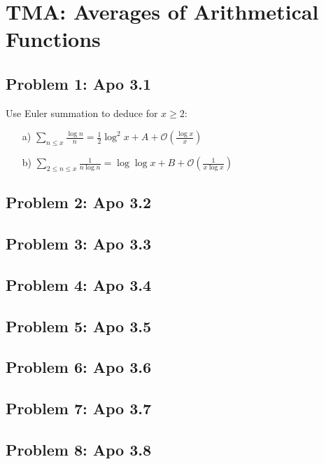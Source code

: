 \section{TMA: Averages of Arithmetical Functions}

\subsection[Problem 1]{Problem 1: Apo 3.1}
Use Euler summation to deduce for $x \geq 2:$
\begin{itemize}
    \item[a)] $\sum_{n \leqslant x} \frac{\log{n}}{n} = \frac{1}{2} \log^2{x} + A + \mathcal{O}(\frac{\log{x}}{x})$
    \item[b)] $\sum_{2 \leqslant n \leqslant x} \frac{1}{n \log{n}} = \log{\log{x}} + B + \mathcal{O}(\frac{1}{x \log{x}})$
\end{itemize}

\subsection[Problem 2]{Problem 2: Apo 3.2}

\subsection[Problem 3]{Problem 3: Apo 3.3}

\subsection[Problem 4]{Problem 4: Apo 3.4}

\subsection[Problem 5]{Problem 5: Apo 3.5}

\subsection[Problem 6]{Problem 6: Apo 3.6}

\subsection[Problem 7]{Problem 7: Apo 3.7}

\subsection[Problem 8]{Problem 8: Apo 3.8}

